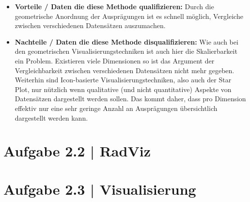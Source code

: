 \documentclass[a4paper,12pt,ngerman]{scrartcl}
\begin{document}
\begin{itemize}
	\item \textbf{Vorteile / Daten die diese Methode qualifizieren:}
	Durch die geometrische Anordnung der Ausprägungen ist es schnell möglich, Vergleiche zwischen verschiedenen Datensätzen auszumachen.

	\item \textbf{Nachteile / Daten die diese Methode disqualifizieren:}
	Wie auch bei den geometrischen Visualisierungstechniken ist auch hier die  Skalierbarkeit ein Problem. Existieren viele Dimensionen so ist das Argument der Vergleichbarkeit zwischen verschiedenen Datensätzen nicht mehr gegeben. Weiterhin sind Icon-basierte Visualisierungstechniken, also  auch der Star Plot, nur nützlich wenn qualitative (und nicht quantitative) Aspekte von Datensätzen dargestellt werden sollen. Das kommt daher, dass pro Dimension effektiv nur eine sehr geringe Anzahl an Ausprägungen übersichtlich dargestellt werden kann.

\end{itemize}

\section{Aufgabe 2.2 | RadViz}
\blindtext

\section{Aufgabe 2.3 | Visualisierung}
\blindtext
\end{document}
